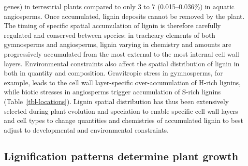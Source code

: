 \documentclass[journal=,manuscript=]{achemso}
\begin{document}
genes) in terrestrial plants compared to only 3 to 7 (0.015--0.036\%) in
aquatic angiosperms.\citep{Blaschek2021, Simoes2020} Once accumulated,
lignin deposits cannot be removed by the plant. The timing of specific
spatial accumulation of lignin is therefore carefully regulated and
conserved between species: in tracheary elements of both gymnosperms and
angiosperms, lignin varying in chemistry and amounts are progressively
accumulated from the most external to the most internal cell wall
layers. Environmental constraints also affect the spatial distribution
of lignin in both in quantity and composition. Gravitropic stress in
gymnosperms, for example, leads to the cell wall layer-specific
over-accumulation of H-rich lignins,\citep{Hiraide2021} while biotic
stresses in angiosperms trigger accumulation of S-rich lignins
(Table~\ref{tbl-locations}). Lignin spatial distribution has thus been
extensively selected during plant evolution and speciation to enable
specific cell wall layers and cell types to change quantities and
chemistries of accumulated lignin to best adjust to developmental and
environmental constraints.

\subsection{Lignification patterns determine plant
growth}\label{lignification-patterns-determine-plant-growth}
\end{document}
